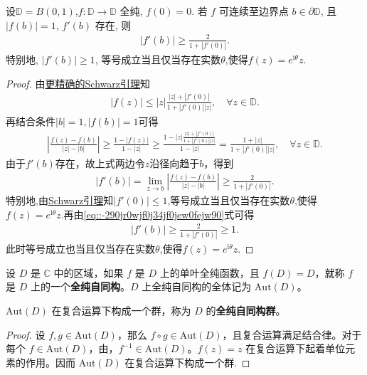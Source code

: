 \documentclass[../../main.tex]{subfiles}%
\begin{document}
\begin{theorem}[Osserman定理]\label{theorem:Osserman定理-2000年}
设\(\mathbb{D} = B(0,1) \),$f:\mathbb{D}\to\mathbb{D}$ 全纯, $f(0)=0$. 若 $f$ 可连续至边界点 $b\in\partial\mathbb{D}$, 且 $|f(b)|=1$, $f'(b)$ 存在, 则
\begin{align*}
|f'(b)|\geqslant \frac{2}{1+|f'(0)|}.
\end{align*}
特别地, $|f'(b)|\geqslant 1$, 等号成立当且仅当存在实数$\theta$,使得$f(z)=e^{\mathrm{i}\theta}z$.
\end{theorem}
\begin{proof}

由\hyperref[theorem:更精确的Schwarz引理]{更精确的Schwarz引理}知
\begin{align*}
|f(z)|\leqslant |z|\frac{|z|+|f'(0)|}{1+|f'(0)||z|},\quad \forall z\in\mathbb{D}.
\end{align*}
再结合条件$|b|=1,|f(b)|=1$可得
\begin{align*}
\left|\frac{f(z)-f(b)}{|z|-|b|}\right|\geqslant \frac{1-|f(z)|}{1-|z|}\geqslant \frac{1-|z|\frac{|z|+|f'(0)|}{1+|f'(0)||z|}}{1-|z|}=\frac{1+|z|}{1+|f'(0)||z|},\quad \forall z\in\mathbb{D}.
\end{align*}
由于$f'(b)$存在，故上式两边令$z$沿径向趋于$b$，得到
\begin{align}\label{eq::-290jr0wjf0j34jf0jew0fejw90}
|f'(b)|=\lim\limits_{z\rightarrow b}\left|\frac{f(z)-f(b)}{|z|-|b|}\right|\geqslant \frac{2}{1+|f'(0)|}.
\end{align}
特别地,由\hyperref[theorem:Schwarz引理-定理4.5.3]{Schwarz引理}知$|f'(0)|\leqslant 1$,等号成立当且仅当存在实数$\theta$,使得$f(z)=e^{\mathrm{i}\theta}z$.再由\eqref{eq::-290jr0wjf0j34jf0jew0fejw90}式可得
\begin{align*}
|f'(b)|\geqslant \frac{2}{1+|f'(0)|}\geqslant 1.
\end{align*}
此时等号成立也当且仅当存在实数$\theta$,使得$f(z)=e^{\mathrm{i}\theta}z$.

\end{proof}

\begin{definition}
设 \( D \) 是 \( \mathbb{C} \) 中的区域，如果 \( f \) 是 \( D \) 上的单叶全纯函数，且 \( f(D) = D \)，就称 \( f \) 是 \( D \) 上的一个\textbf{全纯自同构}。\( D \) 上全纯自同构的全体记为 \( \text{Aut}(D) \)。
\end{definition}

\begin{proposition}
\( \text{Aut}(D) \) 在复合运算下构成一个群，称为 \( D \) 的\textbf{全纯自同构群}。
\end{proposition}
\begin{proof}

设 \( f, g \in \text{Aut}(D) \)，那么 \( f \circ g \in \text{Aut}(D) \)，且复合运算满足结合律。对于每个 \( f \in \text{Aut}(D) \)，由，\( f^{-1} \in \text{Aut}(D) \)。\( f(z) = z \) 在复合运算下起着单位元素的作用。因而 \( \text{Aut}(D) \) 在复合运算下构成一个群.

\end{proof}
\end{document}
